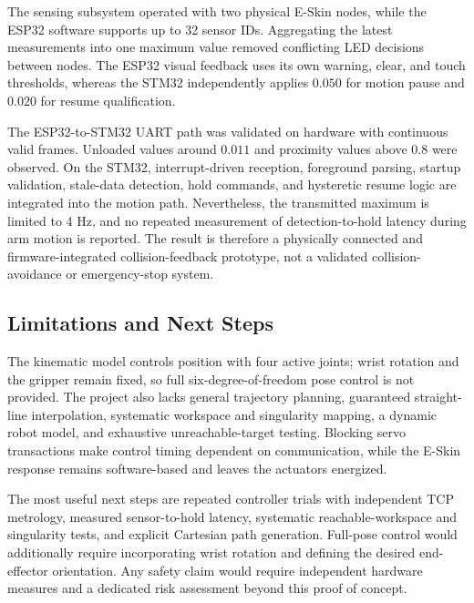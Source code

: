 The sensing subsystem operated with two physical E-Skin nodes, while the ESP32
software supports up to 32 sensor IDs. Aggregating the latest measurements into
one maximum value removed conflicting LED decisions between nodes. The ESP32
visual feedback uses its own warning, clear, and touch thresholds, whereas the
STM32 independently applies \(0.050\) for motion pause and \(0.020\) for resume
qualification.

The ESP32-to-STM32 UART path was validated on hardware with continuous valid
frames. Unloaded values around \(0.011\) and proximity values above \(0.8\) were
observed. On the STM32, interrupt-driven reception, foreground parsing, startup
validation, stale-data detection, hold commands, and hysteretic resume logic
are integrated into the motion path. Nevertheless, the transmitted maximum is
limited to 4 Hz, and no repeated measurement of detection-to-hold latency during
arm motion is reported. The result is therefore a physically connected and
firmware-integrated collision-feedback prototype, not a validated
collision-avoidance or emergency-stop system.

\subsection{Limitations and Next Steps}

The kinematic model controls position with four active joints; wrist rotation
and the gripper remain fixed, so full six-degree-of-freedom pose control is not
provided. The project also lacks general trajectory planning, guaranteed
straight-line interpolation, systematic workspace and singularity mapping, a
dynamic robot model, and exhaustive unreachable-target testing. Blocking servo
transactions make control timing dependent on communication, while the E-Skin
response remains software-based and leaves the actuators energized.

The most useful next steps are repeated controller trials with independent TCP
metrology, measured sensor-to-hold latency, systematic reachable-workspace and
singularity tests, and explicit Cartesian path generation. Full-pose control
would additionally require incorporating wrist rotation and defining the
desired end-effector orientation. Any safety claim would require independent
hardware measures and a dedicated risk assessment beyond this proof of concept.
